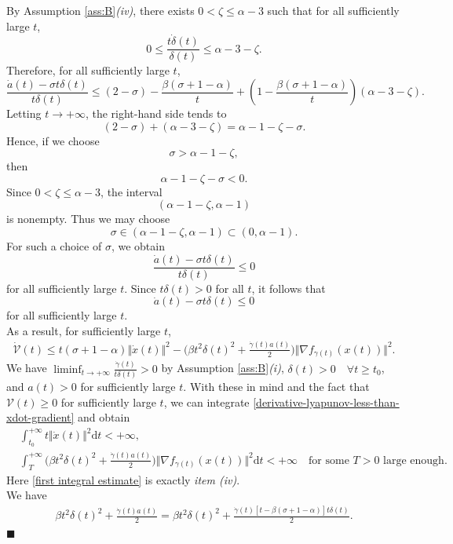 \documentclass[11pt]{article}
\numberwithin{equation}{section}
\newenvironment{proof}{\bigskip\noindent{\bf Proof.}}{\hfill $\blacksquare$ \par\bigskip\noindent}
\begin{document}
\begin{proof}
By Assumption \ref{ass:B}\textit{(iv)}, there exists \(0<\zeta\le\alpha-3\) such that for all sufficiently large \(t\),
\[
0\le \frac{t\dot\delta(t)}{\delta(t)}\le \alpha-3-\zeta.
\]
Therefore, for all sufficiently large \(t\),
\[
\frac{\dot a(t)-\sigma t\delta(t)}{t\delta(t)}
\le
(2-\sigma)-\frac{\beta(\sigma+1-\alpha)}{t}
+\left(1-\frac{\beta(\sigma+1-\alpha)}{t}\right)(\alpha-3-\zeta).
\]
Letting \(t\to+\infty\), the right-hand side tends to
\[
(2-\sigma)+(\alpha-3-\zeta)=\alpha-1-\zeta-\sigma.
\]
Hence, if we choose
\[
\sigma>\alpha-1-\zeta,
\]
then
\[
\alpha-1-\zeta-\sigma<0.
\]
Since \(0<\zeta\le\alpha-3\), the interval
\[
(\alpha-1-\zeta,\alpha-1)
\]
is nonempty. Thus we may choose
\[
\sigma\in(\alpha-1-\zeta,\alpha-1)\subset(0,\alpha-1).
\]
For such a choice of \(\sigma\), we obtain
\[
\frac{\dot a(t)-\sigma t\delta(t)}{t\delta(t)}\le 0
\]
for all sufficiently large \(t\). Since \(t\delta(t)>0\) for all \(t\), it follows that
\[
\dot a(t)-\sigma t\delta(t)\le 0
\]
for all sufficiently large \(t\).\\ 
As a result, for sufficiently large $t$,
\begin{align}
\label{derivative-lyapunov-less-than-xdot-gradient}
    \dot{\mathcal{V}}(t) \le  
t(\sigma+1-\alpha)\Vert \dot{x}(t) \Vert^2
-\Big(\beta t^2\delta(t)^2+\frac{\dot{\gamma}(t)a(t)}{2}\Big)\Vert \nabla f_{\gamma(t)}(x(t)) \Vert^2.
\end{align}
We have $\liminf_{t \to +\infty}\frac{\dot{\gamma}(t)}{t\delta(t)}>0$ by Assumption \ref{ass:B}\textit{(i)}, $\delta(t)>0 \quad \forall t \geq t_0$, and $a(t)>0$ for sufficiently large $t$. With these in mind and the fact that $\mathcal{V}(t) \geq 0$ for sufficiently large $t$, we can integrate \eqref{derivative-lyapunov-less-than-xdot-gradient} and obtain 
\begin{align}
\label{first integral estimate}
    &\int_{t_0}^{+\infty} t\Vert \dot{x}(t)\Vert^2 \mathrm{d}t <+\infty, \\
    \label{almost second integral estimate}
    &\int_{T}^{+\infty} \Big(\beta t^2\delta(t)^2+\frac{\dot{\gamma}(t)a(t)}{2}\Big)\Vert \nabla f_{\gamma(t)}(x(t)) \Vert^2\mathrm{d}t <+\infty \quad 
    \text{for some } T>0 \text{ large enough}. 
\end{align}
Here \eqref{first integral estimate} is exactly \emph{item \textit{(iv)}}. \\
We have
\begin{align*}
\beta t^2\delta(t)^2+\frac{\dot{\gamma}(t)a(t)}{2}=\beta t^2\delta(t)^2+\frac{\dot{\gamma}(t)[t-\beta(\sigma+1-\alpha)]t\delta(t)}{2}.  

\end{align*}
\end{proof}
\end{document}

